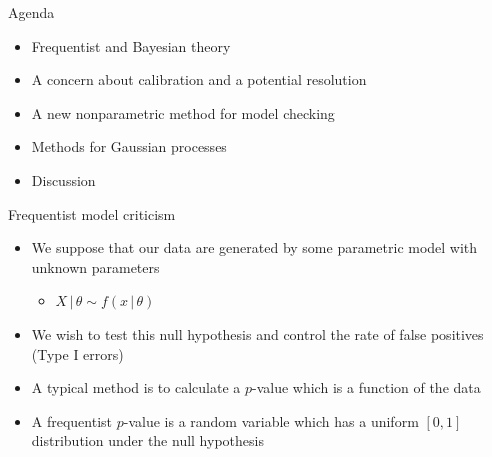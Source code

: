 \begin{frame}{Agenda}
  \begin{itemize}
    \item Frequentist and Bayesian theory
    \vspace{\baselineskip}
    \item A concern about calibration and a potential resolution
    \vspace{\baselineskip}
    \item A new nonparametric method for model checking
    \vspace{\baselineskip}
    \item Methods for Gaussian processes
    \vspace{\baselineskip}
    \item Discussion
  \end{itemize}
\end{frame}

\begin{frame}{Frequentist model criticism}
  \begin{itemize}
    \item We suppose that our data are generated by some parametric model with unknown parameters
    \begin{itemize}
      \item $X \,|\, \theta \sim f(x\,|\,\theta)$
    \end{itemize}
    \vspace{\baselineskip}
    \pause
    \item We wish to test this null hypothesis and control the rate of false positives (Type I errors)
    \vspace{\baselineskip}
    \pause
    \item A typical method is to calculate a $p$-value which is a function of the data
    \vspace{\baselineskip}
    \pause
    \item A frequentist $p$-value is a random variable which has a uniform $[0,1]$ distribution under the null hypothesis
  \end{itemize}
\end{frame}

